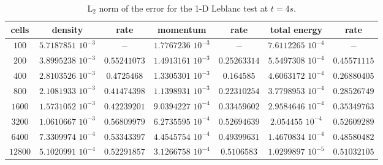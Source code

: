 \begin{table}[!htbp]
\begin{center}
 \caption{\label{tbl:l2_norm_leblanc} L$_2$ norm of the error for the 1-D Leblanc test at $t=4s$.}
 \begin{tabular}{|c|c|c|c|c|c|c|}
 \hline
   cells & density & rate & momentum & rate & total energy & rate \\ \hline
$100$ &   $5.7187851$ $10^{-3}$ & $-$ & $1.7767236$ $10^{-3}$ & $-$ & $7.6112265$  $10^{-4}$& $-$\\   \hline
$200$  &  $3.8995238$ $10^{-3}$ & $0.55241073$ & $1.4913161$ $10^{-3}$ & $0.25263314$ &  $5.5497308$ $10^{-4}$& $0.45571115$\\ \hline
$400$ & $2.8103526$ $10^{-3}$   & $0.4725468$ & $1.3305301$ $10^{-3}$ & $0.164585$ & $4.6063172$ $10^{-4}$ & $0.26880405$\\ \hline
$800$ & $2.1081933$ $10^{-3}$   & $0.41474398$ & $1.1398931$ $10^{-3}$ & $0.22310254$ & $3.7798953$ $10^{-4}$ & $0.28526749$\\ \hline
$1600$ & $1.5731052$ $10^{-3}$  & $0.42239201$ & $9.0394227$ $10^{-4}$ & $0.33459602$ & $2.9584646$ $10^{-4}$ & $0.35349763$\\ \hline
$3200$&$1.0610667$ $10^{-3}$    & $0.56809979$ & $6.2735595$ $10^{-4}$ & $0.52694639$ & $2.054455$ $10^{-4}$ & $0.52609289$\\ \hline
$6400$&$7.3309974$ $10^{-4}$    & $0.53343397$ & $4.4545754$ $10^{-4}$ & $0.49399631$ & $1.4670834$ $10^{-4}$ & $0.48580482$\\ \hline
 $12800$&$5.1020991$ $10^{-4}$  & $0.52291857$ & $3.1266758$ $10^{-4}$ & $0.5106583$ & $1.0299897$ $10^{-5}$ & $0.51032105$\\  \hline
\end{tabular}
\end{center}
\nonumber
\end{table}

